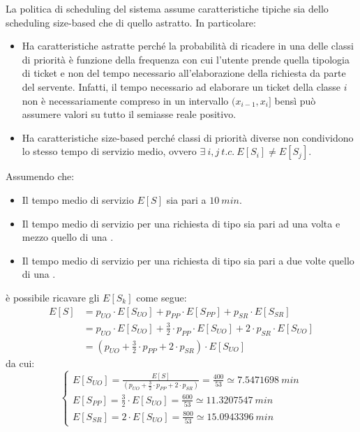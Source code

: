 La politica di scheduling del sistema assume caratteristiche tipiche sia dello scheduling size-based che di quello astratto. In particolare:
\begin{itemize}
\item Ha caratteristiche astratte perché la probabilità di ricadere in una delle classi di priorità è funzione della frequenza con cui l'utente prende quella tipologia di ticket e non del tempo necessario all'elaborazione della richiesta da parte del servente. Infatti, il tempo necessario ad elaborare un ticket della classe $i$ non è necessariamente compreso in un intervallo $(x_{i-1}, x_i]$ bensì può assumere valori su tutto il semiasse reale positivo. 
\item Ha caratteristiche size-based perché classi di priorità diverse non condividono lo stesso tempo di servizio medio, ovvero $\exists\ i,j\ t.c.\ E[S_i] \neq E[S_j]$.
\end{itemize}

Assumendo che:
\begin{itemize}
\item Il tempo medio di servizio $E[S]$ sia pari a $10\ min$.
\item Il tempo medio di servizio per una richiesta di tipo \pp{} sia pari ad una volta e mezzo quello di una \uo{}.
\item Il tempo medio di servizio per una richiesta di tipo \sr{} sia pari a due volte quello di una \uo{}.
\end{itemize}
è possibile ricavare gli $E[S_k]$ come segue:
\begin{equation}
\begin{split}
E[S] &= p_{UO}\cdot E[S_{UO}] + p_{PP}\cdot E[S_{PP}] + p_{SR}\cdot E[S_{SR}] \\
&= p_{UO}\cdot E[S_{UO}] + \frac{3}{2}\cdot p_{PP}\cdot E[S_{UO}] + 2\cdot p_{SR}\cdot E[S_{UO}] \\
&= (p_{UO} + \frac{3}{2}\cdot p_{PP} + 2\cdot p_{SR}) \cdot E[S_{UO}]
\end{split}
\end{equation}
da cui:
\begin{equation}
\begin{cases}
E[S_{UO}] = \frac{E[S]}{(p_{UO} + \frac{3}{2}\cdot p_{PP} + 2\cdot p_{SR})} = \frac{400}{53} \simeq 7.5471698\ min \\[1em]
E[S_{PP}] = \frac{3}{2}\cdot E[S_{UO}] = \frac{600}{53} \simeq 11.3207547\ min \\[1em]
E[S_{SR}] = 2 \cdot E[S_{UO}] = \frac{800}{53} \simeq 15.0943396\ min
\end{cases}
\end{equation}

